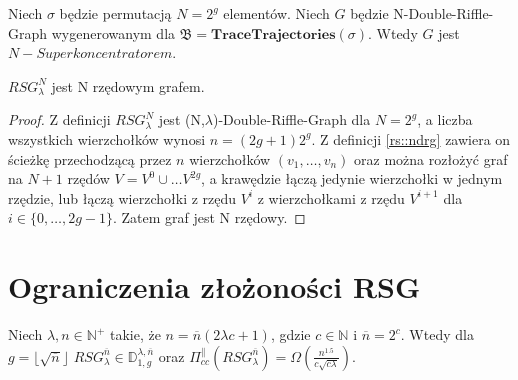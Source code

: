 \begin{theorem} \label{rs::superk} \cite[Twierdzenie 5]{rs} Niech $\sigma$ będzie permutacją $N = 2^g$ elementów.
	Niech $G$ będzie N-Double-Riffle-Graph wygenerowanym dla $\mathfrak{B} = \mathbf{TraceTrajectories}(\sigma)$.
	Wtedy $G$ jest $N-Superkoncentratorem$.
\end{theorem}

\begin{theorem} \label{rs::rzed}
	$RSG_{\lambda}^{N}$ jest N rzędowym grafem.
\end{theorem}

\begin{proof}
	Z definicji $RSG_{\lambda}^{N}$ jest (N,$\lambda$)-Double-Riffle-Graph dla $N = 2^g$, a liczba wszystkich wierzchołków wynosi $n = (2g + 1)2^g$.
	Z definicji \ref{rs::ndrg} zawiera on ścieżkę przechodzącą przez $n$ wierzchołków $(v_{1},\dots,v_{n})$ oraz można rozłożyć graf na $N+1$ rzędów $V = V^{0} \cup \dots V^{2g}$, a krawędzie łączą jedynie wierzchołki w jednym rzędzie, lub łączą wierzchołki z rzędu $V^{i}$ z wierzchołkami z rzędu $V^{i+1}$ dla $i \in \{0,\dots,2g-1\}$. Zatem graf jest N rzędowy.
	
\end{proof}



\section{Ograniczenia złożoności RSG}

\begin{theorem}
	Niech $ \lambda, n \in \mathbb{N}^{+}$ takie, że $n = \overline{n}(2 \lambda c + 1) $, gdzie $c \in \mathbb{N}$ i $ \overline{n} = 2^{c}$.
	Wtedy dla $ g = \lfloor \sqrt{ \overline{n}} \rfloor$
	$ RSG_{\lambda}^{ \overline{n}} \in \mathbb{D}_{1,g}^{\lambda, \overline{n}} $
	oraz
	$ \Pi_{cc}^{ \parallel }(RSG_{\lambda}^{\overline{n}}) = \Omega \left( \frac{n^{1.5}}{c \sqrt{c \lambda}} \right) $.
\end{theorem}

